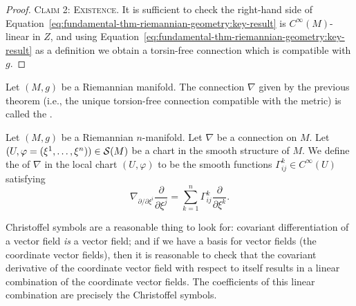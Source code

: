 \begin{proof}
\textsc{Claim 2: Existence.} It is sufficient to check the right-hand
side of
Equation~\eqref{eq:fundamental-thm-riemannian-geometry:key-result} is
$C^{\infty}(M)$-linear in $Z$, and using
Equation~\eqref{eq:fundamental-thm-riemannian-geometry:key-result} as
a definition we obtain a torsin-free connection which is compatible
with $g$.
\end{proof}

\begin{definition}
Let $(M,g)$ be a Riemannian manifold.
The connection $\nabla$ given by the previous theorem (i.e., the
unique torsion-free connection compatible with the metric) is called
the .
\end{definition}

\begin{definition}
Let $(M,g)$ be a Riemannian $n$-manifold. Let $\nabla$ be a connection
on $M$. Let $(U,\varphi=(\xi^{1},\dots,\xi^{n}))\in\mathcal{S}(M)$ be a
chart in the smooth structure of $M$. We define the
 of $\nabla$ in the local chart
$(U,\varphi)$ to be the smooth functions $\Gamma^{k}_{ij}\in C^{\infty}(U)$
satisfying
\begin{equation}
\nabla_{\partial/\partial\xi^{i}}\frac{\partial}{\partial\xi^{j}}=\sum^{n}_{k=1}\Gamma^{k}_{ij}\frac{\partial}{\partial\xi^{k}}.
\end{equation}
\end{definition}

\begin{node}
Christoffel symbols are a reasonable thing to look for: covariant
differentiation of a vector field \emph{is} a vector field; and if we
have a basis for vector fields (the coordinate vector fields), then it is
reasonable to check that the covariant derivative of the coordinate
vector field with respect to itself results in a linear combination of
the coordinate vector fields. The coefficients of this linear
combination are precisely the Christoffel symbols.
\end{node}

